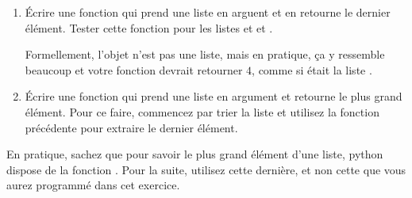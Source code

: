 
\begin{exercice}\label{exoPremiere-0039}

    \begin{enumerate}
        \item
            Écrire une fonction qui prend une liste en arguent et en retourne le dernier élément. Tester cette fonction pour les listes  et  et .

            Formellement, l'objet  n'est pas une liste, mais en pratique, ça y ressemble beaucoup et votre fonction devrait retourner \( 4\), comme si  était la liste \info{[1,2,3,4]}.
        \item
            Écrire une fonction qui prend une liste en argument et retourne le plus grand élément. Pour ce faire, commencez par trier la liste et utilisez la fonction précédente pour extraire le dernier élément.
    \end{enumerate}
    En pratique, sachez que pour savoir le plus grand élément d'une liste, python dispose de la fonction . Pour la suite, utilisez cette dernière, et non cette que vous aurez programmé dans cet exercice.

\end{exercice}
